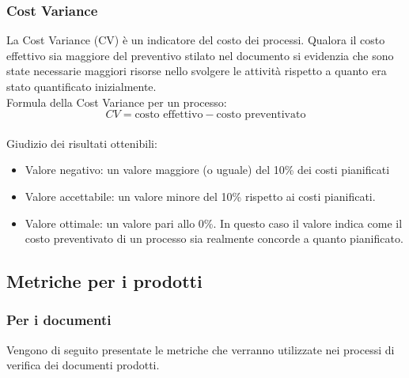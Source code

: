 \documentclass[a4paper, titlepage]{article}
\begin{document}
\subsubsection{Cost Variance}
\label{par:CV}
La Cost Variance (CV) è un indicatore del costo dei processi. Qualora il costo effettivo sia maggiore del preventivo stilato nel documento  si evidenzia che sono state necessarie maggiori risorse nello svolgere le attività rispetto a quanto era stato quantificato inizialmente.
\\Formula della Cost Variance per un processo:
\begin{displaymath}
CV= \mbox{costo effettivo} - \mbox{costo preventivato}
\end{displaymath}
\\ Giudizio dei risultati ottenibili:
\begin{itemize}
\item Valore negativo: un valore maggiore (o uguale) del 10\% dei costi pianificati
\item Valore accettabile: un valore minore del 10\% rispetto ai costi pianificati.
\item Valore ottimale: un valore pari allo 0\%. In questo caso il valore indica come il costo preventivato di un processo sia realmente concorde a quanto pianificato. 
\end{itemize}

\subsection{Metriche per i prodotti}

\subsubsection{Per i documenti}
Vengono di seguito presentate le metriche che verranno utilizzate nei processi di verifica dei documenti prodotti.
\end{document}
